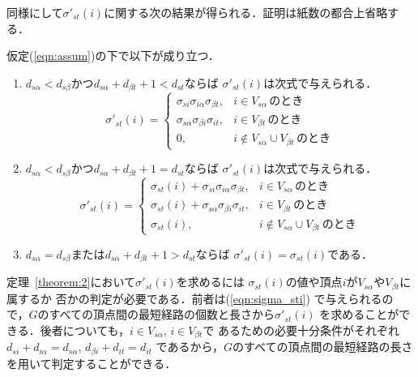 同様にして$\sigma'_{st}(i)$に関する次の結果が得られる．証明は紙数の都合上省略する．
\begin{theorem}
\rm 
仮定(\ref{eqn:assum})の下で以下が成り立つ．
\begin{enumerate}
\item $d_{s\alpha}<d_{s\beta}$かつ$d_{s\alpha}+d_{\beta t}+1<d_{st}$ならば
$\sigma'_{st}(i)$は次式で与えられる．
\[
 \sigma'_{st}(i)=\left\{
\begin{array}{ll}
\sigma_{si}\sigma_{i\alpha}\sigma_{\beta t}, & i \in V_{s\alpha}\,\mbox{のとき} \\
\sigma_{s\alpha}\sigma_{\beta i}\sigma_{it}, & i \in V_{\beta t}\,\mbox{のとき} \\
0, & i \not\in V_{s\alpha} \cup V_{\beta t}\,\mbox{のとき}
\end{array}
\right.
\]
%
\item $d_{s\alpha}<d_{s\beta}$かつ$d_{s\alpha}+d_{\beta t}+1=d_{st}$ならば
$\sigma'_{st}(i)$は次式で与えられる．
\[
 \sigma'_{st}(i)=\left\{
\begin{array}{ll}
\sigma_{st}(i)+\sigma_{si}\sigma_{i\alpha}\sigma_{\beta t}, & i \in V_{s\alpha}\,\mbox{のとき} \\
\sigma_{st}(i)+\sigma_{s\alpha}\sigma_{\beta i}\sigma_{it}, & i \in V_{\beta t}\,\mbox{のとき} \\
\sigma_{st}(i), & i \not\in V_{s\alpha} \cup V_{\beta t}\,\mbox{のとき}
\end{array}
\right.
\]
%
\item $d_{s\alpha}=d_{s\beta}$または$d_{s\alpha}+d_{\beta t}+1>d_{st}$ならば
$\sigma'_{st}(i)=\sigma_{st}(i)$である．
\end{enumerate}
\label{theorem:2}
\end{theorem}

定理~\ref{theorem:2}において$\sigma'_{st}(i)$を求めるには
$\sigma_{st}(i)$の値や頂点$i$が$V_{s\alpha}$や$V_{\beta t}$に属するか
否かの判定が必要である．前者は(\ref{eqn:sigma_sti})
で与えられるので，$G$のすべての頂点間の最短経路の個数と長さから$\sigma'_{st}(i)$
を求めることができる．後者についても，$i \in V_{s\alpha}$, $i \in V_{\beta t}$で
あるための必要十分条件がそれぞれ$d_{si}+d_{i\alpha}=d_{s\alpha}$, 
$d_{\beta i}+d_{it}=d_{it}$
であるから，$G$のすべての頂点間の最短経路の長さを用いて判定することができる．
